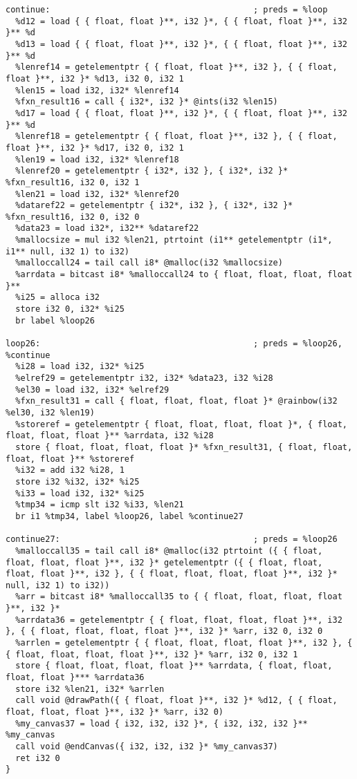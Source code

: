\documentclass[main.tex]{subfiles}
\begin{document}
{\begin{lstlisting}
continue:                                         ; preds = %loop
  %d12 = load { { float, float }**, i32 }*, { { float, float }**, i32 }** %d
  %d13 = load { { float, float }**, i32 }*, { { float, float }**, i32 }** %d
  %lenref14 = getelementptr { { float, float }**, i32 }, { { float, float }**, i32 }* %d13, i32 0, i32 1
  %len15 = load i32, i32* %lenref14
  %fxn_result16 = call { i32*, i32 }* @ints(i32 %len15)
  %d17 = load { { float, float }**, i32 }*, { { float, float }**, i32 }** %d
  %lenref18 = getelementptr { { float, float }**, i32 }, { { float, float }**, i32 }* %d17, i32 0, i32 1
  %len19 = load i32, i32* %lenref18
  %lenref20 = getelementptr { i32*, i32 }, { i32*, i32 }* %fxn_result16, i32 0, i32 1
  %len21 = load i32, i32* %lenref20
  %dataref22 = getelementptr { i32*, i32 }, { i32*, i32 }* %fxn_result16, i32 0, i32 0
  %data23 = load i32*, i32** %dataref22
  %mallocsize = mul i32 %len21, ptrtoint (i1** getelementptr (i1*, i1** null, i32 1) to i32)
  %malloccall24 = tail call i8* @malloc(i32 %mallocsize)
  %arrdata = bitcast i8* %malloccall24 to { float, float, float, float }**
  %i25 = alloca i32
  store i32 0, i32* %i25
  br label %loop26

loop26:                                           ; preds = %loop26, %continue
  %i28 = load i32, i32* %i25
  %elref29 = getelementptr i32, i32* %data23, i32 %i28
  %el30 = load i32, i32* %elref29
  %fxn_result31 = call { float, float, float, float }* @rainbow(i32 %el30, i32 %len19)
  %storeref = getelementptr { float, float, float, float }*, { float, float, float, float }** %arrdata, i32 %i28
  store { float, float, float, float }* %fxn_result31, { float, float, float, float }** %storeref
  %i32 = add i32 %i28, 1
  store i32 %i32, i32* %i25
  %i33 = load i32, i32* %i25
  %tmp34 = icmp slt i32 %i33, %len21
  br i1 %tmp34, label %loop26, label %continue27

continue27:                                       ; preds = %loop26
  %malloccall35 = tail call i8* @malloc(i32 ptrtoint ({ { float, float, float, float }**, i32 }* getelementptr ({ { float, float, float, float }**, i32 }, { { float, float, float, float }**, i32 }* null, i32 1) to i32))
  %arr = bitcast i8* %malloccall35 to { { float, float, float, float }**, i32 }*
  %arrdata36 = getelementptr { { float, float, float, float }**, i32 }, { { float, float, float, float }**, i32 }* %arr, i32 0, i32 0
  %arrlen = getelementptr { { float, float, float, float }**, i32 }, { { float, float, float, float }**, i32 }* %arr, i32 0, i32 1
  store { float, float, float, float }** %arrdata, { float, float, float, float }*** %arrdata36
  store i32 %len21, i32* %arrlen
  call void @drawPath({ { float, float }**, i32 }* %d12, { { float, float, float, float }**, i32 }* %arr, i32 0)
  %my_canvas37 = load { i32, i32, i32 }*, { i32, i32, i32 }** %my_canvas
  call void @endCanvas({ i32, i32, i32 }* %my_canvas37)
  ret i32 0
}


\end{lstlisting}}
\end{document}
